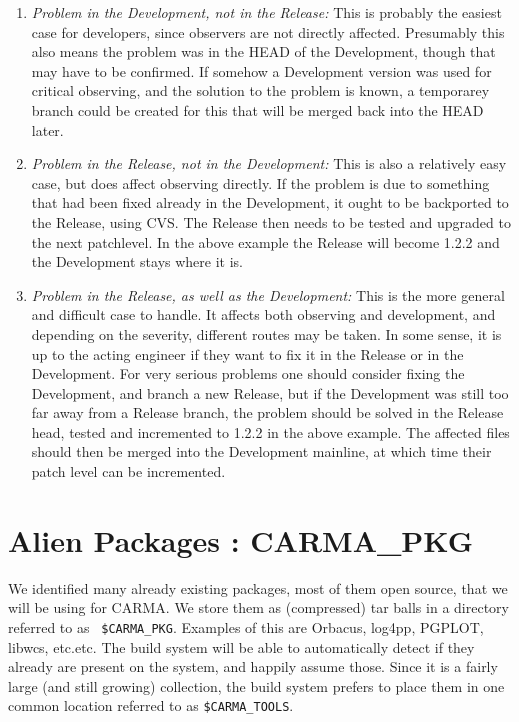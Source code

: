 \documentclass{article}
\begin{document}
\begin{enumerate}

\item
{\it Problem in the Development, not in the Release:}
\newline
This is probably the easiest case for developers, since observers are
not directly affected.
Presumably this also means the problem was in the HEAD of the Development,
though that may have to be confirmed.
If somehow a Development version was used for 
critical observing, and the solution to the problem is
known, a temporarey branch could be created for this that will be merged
back into the HEAD later.

\item
{\it Problem in the Release, not in the Development:}
\newline
This is also a relatively easy case, but does affect observing
directly. If the problem is due to something that
had been fixed already in the Development, it ought to be backported to the
Release, using CVS. The Release then needs to be tested and upgraded
to the next patchlevel.
In the above example the Release
will become 1.2.2 and the Development stays where it is. 


\item
{\it Problem in the Release, as well as the Development:}
\newline
This is the more general and difficult case to handle. It affects
both observing and development, and depending on the severity,
different routes may be taken.
In some sense, it is up to the
acting engineer if they want to fix it in the Release or in the
Development. For very serious problems one should consider fixing
the Development, and branch a new Release, but if the Development
was still too far away from a Release branch, the problem
should be solved in the Release head, tested and incremented
to 1.2.2 in the above example. The affected files should then
be merged into the Development mainline, at which time their
patch level can be incremented. 


\end{enumerate}



\section{Alien Packages : CARMA\_PKG}

We identified many already existing packages, most of them open
source, that we will be using for CARMA.  We store them as
(compressed) tar balls in a directory referred to as {\tt
\$CARMA\_PKG}.  Examples of this are Orbacus, log4pp, PGPLOT, libwcs,
etc.etc.  The build system will be able to automatically detect if
they already are present on the system, and happily assume
those. Since it is a fairly large (and still growing) collection, the
build system prefers to place them in one common location referred to
as {\tt \$CARMA\_TOOLS}.
\end{document}
